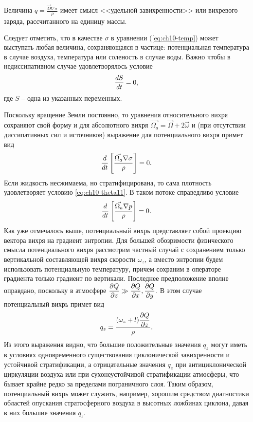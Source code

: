 Величина $q=\frac{\vec{\Omega}\nabla\sigma}{\rho}$ имеет смысл <<удельной завихренности>> или вихревого заряда, рассчитанного на единицу массы. 

Следует отметить, что в качестве $\sigma$ в уравнении (\ref{eq:ch10-temp}) может выступать любая величина, сохраняющаяся в частице: потенциальная температура в случае воздуха, температура или соленость в случае воды. Важно чтобы в недиссипативном случае удовлетворялось условие
\begin{equation}
    \label{eq:ch10-theta11}
    \displaystyle\frac{d S}{d t}=0,
\end{equation}
где $S$ -- одна из указанных переменных.

Поскольку вращение Земли постоянно, то уравнения относительного вихря сохраняют свой форму и для абсолютного вихря $\vec{\Omega_a}=\vec{\Omega}+2\vec{\omega}$ и (при отсутствии диссипативных сил и источников) выражение для потенциального вихря примет вид
\begin{equation*}
    \displaystyle\frac{d }{d t} \displaystyle \left[  \frac{\vec{\Omega_a}\nabla\sigma}{\rho}   \right] = 0.
\end{equation*}
Если жидкость несжимаема, но стратифицирована, то сама плотность удовлетворяет условию \ref{eq:ch10-theta11}. В таком потоке справедливо условие
\begin{equation*}
    \displaystyle\frac{d }{d t} \displaystyle \left[  \frac{\vec{\Omega_a}\nabla p  }{\rho}   \right] = 0.
\end{equation*}
Как уже отмечалось выше, потенциальный вихрь представляет собой проекцию вектора вихря на градиент энтропии. Для большей обозримости физического смысла потенциального вихря рассмотрим частный случай с сохранением только вертикальной составляющей вихря скорости $\omega_z$, а вместо энтропии будем использовать потенциальную температуру, причем сохраним в операторе градиента только градиент по вертикали. Последнее предположение вполне оправдано, поскольку в атмосфере $\displaystyle\frac{\partial Q}{\partial z}\gg\displaystyle\frac{\partial Q}{\partial x}, \displaystyle\frac{\partial Q}{\partial y}$. В этом случае потенциальный вихрь примет вид
\begin{equation}
    \label{eq:ch10-theta12}
    q_z = \frac{(\omega_z+l)\displaystyle\frac{\partial Q}{\partial z}}{\rho}.
\end{equation}
Из этого выражения видно, что большие положительные значения $q_z$ могут иметь в условиях одновременного существования циклонической завихренности и устойчивой стратификации, а отрицательные значения $q_z$ при антициклонической циркуляции воздуха или при сухонеустойчивой стратификации атмосферы, что бывает крайне редко за пределами пограничного слоя. Таким образом, потенциальный вихрь может служить, например, хорошим средством диагностики областей опускания стратосферного воздуха в высотных ложбинах циклона, давая в них большие значения $q_z$.

